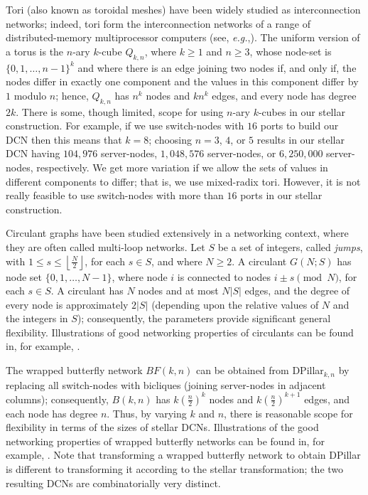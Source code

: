 \documentclass[]{amsart}
\newcommand\set[1]{\{#1\}}
\newcommand\flr[2]{\left\lfloor \frac{#1}{#2} \right\rfloor}
\begin{document}
Tori (also known as toroidal meshes) have been widely studied as interconnection networks; indeed, tori form the interconnection networks of a range of distributed-memory multiprocessor computers (see, \emph{e.g.},\cite{DallyTowles2003}). The uniform version of a torus is the $n$-ary $k$-cube $Q_{k,n}$, where $k\geq 1$ and $n\geq 3$, whose node-set is $\{0,1,\ldots,n-1\}^k$ and where there is an edge joining two nodes if, and only if, the nodes differ in exactly one component and the values in this component differ by $1$ modulo $n$; hence, $Q_{k,n}$ has $n^k$ nodes and $kn^k$ edges, and every node has degree $2k$. There is some, though limited, scope for using $n$-ary $k$-cubes in our stellar construction. For example, if we use switch-nodes with $16$ ports to build our DCN then this means that $k=8$; choosing $n=3$, $4$, or $5$ results in our stellar DCN having $104,976$ server-nodes, $1,048,576$ server-nodes, or $6,250,000$ server-nodes, respectively. We get more variation if we allow the sets of values in different components to differ; that is, we use mixed-radix tori. However, it is not really feasible to use switch-nodes with more than $16$ ports in our stellar construction.

Circulant graphs have been studied extensively in a networking
context, where they are often called multi-loop networks.  Let $S$ be a set of integers, called \emph{jumps}, with $1\le s \le \flr{N}{2}$, for each $s\in S$, and where $N\ge 2$.  A circulant $G(N;S)$ has node set $\set{0,1,\ldots, N-1}$, where node $i$ is connected to nodes $i\pm s \pmod N$, for each $s\in S$.  A circulant has $N$ nodes and at most $N|S|$ edges, and the degree of every node is approximately $2|S|$ (depending upon the relative values of $N$ and the integers in $S$); consequently, the parameters provide significant general flexibility. Illustrations of good networking properties of circulants can be found in, for example, \cite{CaiHavasMans1999,Hwang2003,Monakhova2012}.

The wrapped butterfly network $BF(k,n)$ can be obtained from DPillar$_{k,n}$ by replacing all switch-nodes with bicliques (joining server-nodes in adjacent columns); consequently, $B(k,n)$ has $k(\frac{n}{2})^k$ nodes and $k(\frac{n}{2})^{k+1}$ edges, and each node has degree $n$. Thus, by varying $k$ and $n$, there is reasonable scope for flexibility in terms of the sizes of stellar DCNs. Illustrations of the good networking properties of wrapped butterfly networks can be found in, for example, \cite{FuChau1998,TouzeneDayMonien2005}. Note that transforming a wrapped butterfly network to obtain DPillar is different to transforming it according to the stellar transformation; the two resulting DCNs are combinatorially very distinct.
\end{document}
